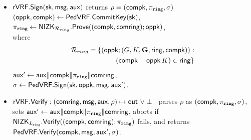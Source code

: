 	\def\tmpaux{\aux \doubleplus \compk \doubleplus \piring \doubleplus \comring}
	\def\tmpeprintaux{\eprint{\aux'}{\tmpaux}}
	\def\tmpindent{\hspace*{5pt}}
	\begin{itemize}
		\item $\rVRF.\rSign\eprint{ : }{}(\sk,\msg,\aux)\eprint{ \mapsto \rho}{}$ returns $\rho = (\compk,\piring,\sigma)$  
		\tmpindent $(\openpk,\compk) \leftarrow \PedVRF.\CommitKey(\sk)$,  \\
		\tmpindent $\piring \leftarrow \NIZK_{\mathcal{R}_{ring}}.\Prove((\compk,\comring); \openpk)$, \\
		where 
		\begin{align}
				\mathcal{R}_{ring} = \{(\openpk;(\genG,\genB,\grE,\ring, \compk)): \\(\compk-\openpk \, \genB)  \in \ring\} \label{rel:snark} \nonumber
			\end{align}
		\tmpindent $\aux' \leftarrow \tmpaux$,  \\
		\tmpindent $\sigma \leftarrow \PedVRF.\Sign(\sk,\openpk,\msg, \aux')$.
		\item $\rVRF.\rVerify : (\comring,\msg,\aux,\rho) \mapsto \Out \,\, \lor \perp$ \,
		parses $\rho$ as $(\compk,\piring,\sigma)$, sets $\aux' \leftarrow \tmpaux$,
		aborts if $\NIZK_{\Lring}.\Verify((\compk,\comring); \piring)$ fails,
		and returns $\PedVRF.\Verify(\compk,\msg, \aux', \sigma)$.
	\end{itemize}
	







